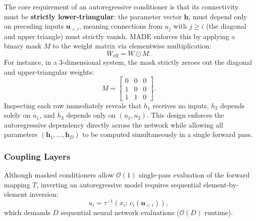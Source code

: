\documentclass[12pt]{article}
\renewcommand{\vec}[1]{\boldsymbol{\mathbf{#1}}}
\begin{document}
        The core requirement of an autoregressive conditioner is that its connectivity must be \textbf{strictly lower-triangular}: the parameter vector $\vec{h}_i$ must depend only on preceding inputs $\vec{u}_{<i}$, meaning connections from $u_j$ with $j \ge i$ (the diagonal and upper triangle) must strictly vanish. MADE enforces this by applying a binary mask $M$ to the weight matrix via elementwise multiplication:
        \begin{equation}
            W_{\text{eff}} = W \odot M.
        \end{equation}
        For instance, in a 3-dimensional system, the mask strictly zeroes out the diagonal and upper-triangular weights:
        \begin{equation}
            M = \begin{bmatrix}
                0 & 0 & 0 \\
                1 & 0 & 0 \\
                1 & 1 & 0
            \end{bmatrix}.
        \end{equation}
        Inspecting each row immediately reveals that $h_1$ receives no inputs, $h_2$ depends solely on $u_1$, and $h_3$ depends only on $(u_1, u_2)$. This design enforces the autoregressive dependency directly across the network while allowing all parameters $(\vec{h}_1, \dots, \vec{h}_D)$ to be computed simultaneously in a single forward pass.

        \subsubsection{Coupling Layers}
        Although masked conditioners allow $\mathcal{O}(1)$ single-pass evaluation of the forward mapping $T$, inverting an autoregressive model requires sequential element-by-element inversion:
        \begin{equation}
            u_i = \tau^{-1}(x_i; \, c_i(\vec{u}_{<i})),
        \end{equation}
        which demands $D$ sequential neural network evaluations ($\mathcal{O}(D)$ runtime).
\end{document}
